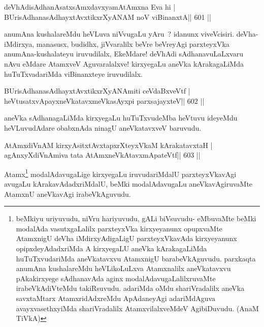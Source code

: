 \begin{shl}
deVhAdisAdhanAsatxsAmxdavxyamAtAmxna Eva hi |
BUrisAdhanasAdhayxtAvxtikxrXyANAM noV viBinanxtA\hfill || 601 ||
\end{shl}

\begin{artha}
anumAna kushalareMdu heVLuva niVvugaLu yAru~? idanunx viveVcisiri. deVha-iMdirxya, manasusx, budidhx, jiVvaralilx beVre beVreyAgi parxteyxVka anumAna-kushalateyu iruvudilalx, EkeMdare! deVhAdi sAdhanavuLaLxvaru nAvu eMdare AtamxveV Aguvaralalxve! kirxyegaLu aneVka kArakagaLiMda huTuTxvadariMda viBinanxteye iruvudilalx.
\end{artha}

\begin{shl}
BUrisAdhanasAdhayxtAvxtikxrXyANAmiti ceVdaBxveVtf |
heVtusatxvApayxneVkatavxmeVkasAyxpi parxsajayxteV\hfill || 602 ||
\end{shl}

\begin{artha}
aneVka sAdhanagaLiMda kirxyegaLu huTuTxvudeMba heVtuvu ideyeMdu heVLuvudAdare obabxnAda ninagU aneVkatavxveV baruvudu.
\end{artha}



\begin{shl}
AtAmxdiVnAM kirxyAsitxtAvxtapxrXteyxVkaM kArakatavxtaH |
agAnxyXdiVnAmiva tata AtAmxneVkAtavxmApateVtf\hfill || 603 ||
\end{shl}

\begin{artha}
Atamx\footnote{beMkiyu uriyuvudu, niVru hariyuvudu, gALi biVsuvudu-
  eMbuvaMte beMki modalAda vasutxgaLalilx parxteyxVka kirxyeyanunx
  opupxvaMte AtamxnigU deVha iMdirxyAdigaLigU parxteyxVkavAda
  kirxyeyanunx opipxdeyAdadxriMda A kirxyegaLU aneVka kArakagaLiMda
  huTuTxvudariMda aneVkatavxvu AtamxnigU barabeVkAguvudu. parxkaqta
  anumAna kushalareMdu heVLikoLuLxva Atamxnalilx aneVkatavxvu
  pAkakirxyege sAdhanavAda aginx modalAdavugaLalilxruvaMte
  irabeVkAdiVteMdu takiRsuvudu. adariMda oMdu shariVradalilx aneVka
  savxtaMtarx AtamxridAdxreMdu ApAdaneyAgi adariMdAguva
  avayxvasethxyiMda shariVradalilx AtamxvilalxveMdeV AgibiDuvudu. 
  (AnaM TiVkA)} modalAdavugaLige kirxyegaLu iruvudariMdalU
parxteyxVkavAgi avugaLu kArakavAdadxriMdalU, beMki modalAdavugaLu
aneVkavAgiruvaMte AtamxnU aneVkavAgi irabeVkAguvudu.
\end{artha}


